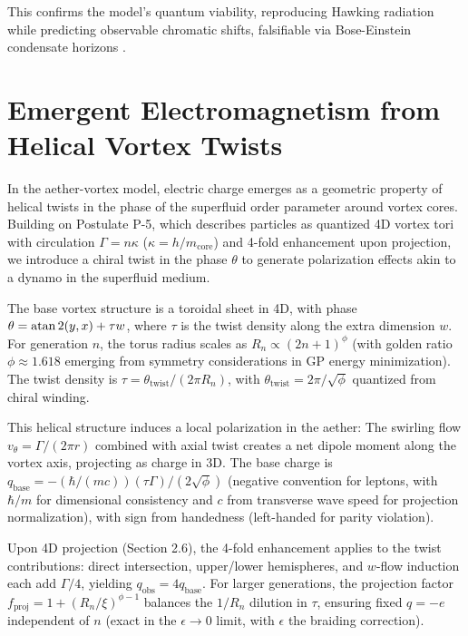 \documentclass{article}
\begin{document}
This confirms the model's quantum viability, reproducing Hawking radiation while predicting observable chromatic shifts, falsifiable via Bose-Einstein condensate horizons \cite{steinhauer2016observation}.

\section{Emergent Electromagnetism from Helical Vortex Twists}

In the aether-vortex model, electric charge emerges as a geometric property of helical twists in the phase of the superfluid order parameter around vortex cores. Building on Postulate P-5, which describes particles as quantized 4D vortex tori with circulation $\Gamma = n \kappa$ ($\kappa = h / m_{\text{core}}$) and 4-fold enhancement upon projection, we introduce a chiral twist in the phase $\theta$ to generate polarization effects akin to a dynamo in the superfluid medium.

The base vortex structure is a toroidal sheet in 4D, with phase $\theta = \atan2(y, x) + \tau w$, where $\tau$ is the twist density along the extra dimension $w$. For generation $n$, the torus radius scales as $R_n \propto (2n+1)^\phi$ (with golden ratio $\phi \approx 1.618$ emerging from symmetry considerations in GP energy minimization). The twist density is $\tau = \theta_{\text{twist}} / (2\pi R_n)$, with $\theta_{\text{twist}} = 2\pi / \sqrt{\phi}$ quantized from chiral winding.

This helical structure induces a local polarization in the aether: The swirling flow $v_{\theta} = \Gamma / (2\pi r)$ combined with axial twist creates a net dipole moment along the vortex axis, projecting as charge in 3D. The base charge is $q_{\text{base}} = - (\hbar / (m c)) (\tau \Gamma) / (2 \sqrt{\phi})$ (negative convention for leptons, with $\hbar / m$ for dimensional consistency and $c$ from transverse wave speed for projection normalization), with sign from handedness (left-handed for parity violation).

Upon 4D projection (Section 2.6), the 4-fold enhancement applies to the twist contributions: direct intersection, upper/lower hemispheres, and $w$-flow induction each add $\Gamma/4$, yielding $q_{\text{obs}} = 4 q_{\text{base}}$. For larger generations, the projection factor $f_{\text{proj}} = 1 + (R_n / \xi)^{\phi - 1}$ balances the $1/R_n$ dilution in $\tau$, ensuring fixed $q = -e$ independent of $n$ (exact in the $\epsilon \to 0$ limit, with $\epsilon$ the braiding correction).
\end{document}
